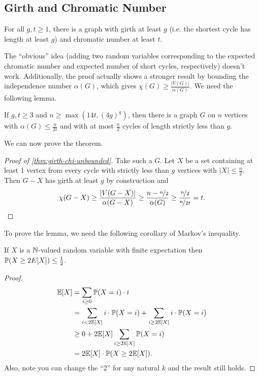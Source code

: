 \documentclass[main.tex]{subfiles}
\begin{document}
\subsection{Girth and Chromatic Number}
\begin{theorem}[Erd\H{o}s]\th\label{thm:girth-chi-unbounded}
  For all $g,t\geq 1$, there is a graph with girth at least $g$ (i.e. the
  shortest cycle has length at least $g$) and chromatic number at least $t$.
\end{theorem}
The ``obvious'' idea (adding two random variables corresponding to the expected
chromatic number and expected number of short cycles, respectively) doesn't work.
Additionally, the proof actually shows a stronger result by bounding the
independence number $\alpha(G)$, which gives $\chi(G)\geq\frac{|V(G)|}{\alpha(G)}$.
We need the following lemma.
\begin{lemma}\th\label{lem:girth-chi-unbounded-helper}
  If $g,t\geq 3$ and $n\geq\max(14t,(4g)^g)$, then there is a graph $G$ on $n$
  vertices with $\alpha(G)\leq\frac{n}{2t}$ and with at most $\frac{n}{2}$
  cycles of length strictly less than $g$.
\end{lemma}
We can now prove the theorem.
\begin{proof}[Proof of \th\ref{thm:girth-chi-unbounded}]
  Take such a $G$.
  Let $X$ be a set containing at least 1 vertex from every cycle with strictly
  less than $g$ vertices with $|X|\leq\frac n 2$.
  Then $G - X$ has girth at least $g$ by construction and
  \[
    \chi(G-X)\geq\frac{|V(G-X)|}{\alpha(G-X)}\geq\frac{n - \nicefrac n 2}{\alpha(G)}
    \geq\frac{\nicefrac n 2}{\nicefrac n{2t}} = t. \qedhere
  \]
\end{proof}
To prove the lemma, we need the following corollary of Markov's inequality.
\begin{corollary}
  If $X$ is a $\mathbb N$-valued random variable with finite expectation then
  $\mathbb P(X\geq 2E[X])\leq\frac{1}{2}$.
\end{corollary}
\begin{proof}
  \leavevmode\vspace{-0.5em}
  \begin{align*}
    \mathbb E[X] &= \sum_{i\geq 0}\mathbb P(X=i)\cdot i \\
           &= \sum_{i < 2\mathbb E[X]}i\cdot\mathbb P(X=i) + \sum_{i\geq 2\mathbb E[X]}i\cdot\mathbb P(X=i) \\
           &\geq 0 + 2\mathbb E[X]\sum_{i\geq 2\mathbb E[X]}\mathbb P(X=i) \\
           &= 2\mathbb E[X]\cdot\mathbb P(X\geq 2\mathbb E[X]).
  \end{align*}
  Also, note you can change the ``2'' for any natural $k$ and the result still
  holds.
\end{proof}
\end{document}
